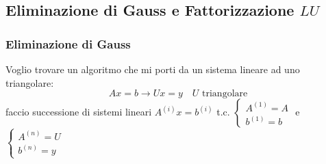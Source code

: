 \documentclass[a4paper,10pt]{article}
\theoremstyle{definition}
\theoremstyle{indentdefinition}
\theoremstyle{indenttheorem}
\theoremstyle{myremark}
\theoremstyle{indentgeneral}
\theoremstyle{plain}
\theoremstyle{plain}
\begin{document}
\subsection{Eliminazione di Gauss e Fattorizzazione $LU$}
\subsubsection{Eliminazione di Gauss}
Voglio trovare un algoritmo che mi porti da un sistema lineare ad uno triangolare:
$$Ax=b\longrightarrow Ux=y \quad U \text{ triangolare}$$
faccio successione di sistemi lineari $A^{(i)}x=b^{(i)}$ t.c. $\begin{cases}
    A^{(1)}=A \\
    b^{(1)}=b
\end{cases}$ e  $\begin{cases}
    A^{(n)}=U \\
    b^{(n)}=y
\end{cases} $
\end{document}
